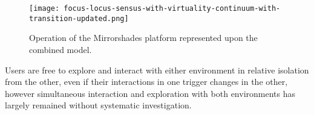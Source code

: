 

\begin{figure}[h]
	\begin{center}
		\texttt{[image: focus-locus-sensus-with-virtuality-continuum-with-transition-updated.png]}
		\caption{Operation of the Mirrorshades platform represented upon the combined model.}
		\label{focus-locus-sensus-with-virtuality-continuum-with-transition}
	\end{center}	
\end{figure}


\clearpage




Users are free to explore and interact with either environment in relative isolation from the other, even if their interactions in one trigger changes in the other, however simultaneous interaction and exploration with both environments has largely remained without systematic investigation.

